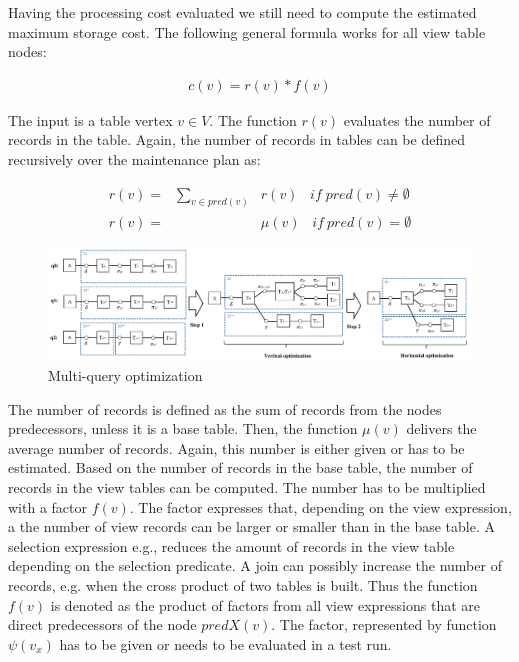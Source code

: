 Having the processing cost evaluated we still need to compute the estimated
maximum storage cost. The following general formula works for all view table
nodes:

\begin{equation} 
\begin{aligned} 	   
   c(v)=r(v)*f(v)
\end{aligned}
\end{equation}


The input is a table vertex $v \in V$. The function $r(v)$ evaluates
the number of records in the table. Again, the number of records in 
tables can be defined recursively over the maintenance plan as:

\begin{equation} 
\begin{aligned} 	   
	r(v)=& \sum_{v \in pred(v)}&r(v)\;\;\; if \; pred(v) \neq \emptyset \\
	r(v)=& &\mu(v)\;\;\; if \: pred(v) = \emptyset
\end{aligned}
\end{equation}


\begin{figure} \centering 
	\includegraphics[width=\linewidth]{figures/VerticalOptimization} 
	\caption{Multi-query optimization} \label{fig:vertical_optimization} 
\end{figure} 

The number of records is defined as the sum of records from the nodes 
predecessors, unless it is a base table. Then,
the function $\mu(v)$ delivers the average number of records. Again, this
number is either given or has to be estimated.
Based on the number of records in the base table, the number of records in 
the view tables can be computed. The number has to be multiplied with a 
factor $f(v)$. The factor expresses that, depending on the view expression,
a the number of view records can be larger or smaller than in the base table.
A selection expression e.g., reduces the amount of records in the view table
depending on the selection predicate. A join can possibly increase the
number of records, e.g. when the cross product of two tables is built. Thus
the function $f(v)$ is denoted as the product of factors from all view 
expressions that are direct predecessors of the node $predX(v)$. The factor, 
represented by function $\psi(v_x)$ has to be given or needs to be evaluated
in a test run.


